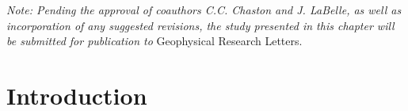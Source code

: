 %
%
%



%
%

\textit{Note: Pending the approval of coauthors C.C. Chaston and
  J. LaBelle, as well as incorporation of any suggested revisions, the
  study presented in this chapter will be submitted for publication
  to} Geophysical Research Letters.

  \section{Introduction}

